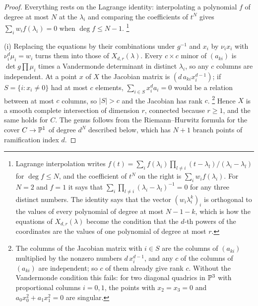 \begin{proof}
Everything rests on the Lagrange identity: interpolating a polynomial $f$
of degree at most $N$ at the $\lambda_{i}$ and comparing the coefficients of
$t^{N}$ gives $\sum_{i}w_{i}f(\lambda_{i})=0$ when $\deg f\le N-1$.%
\footnote{Lagrange interpolation writes
$f(t)=\sum_{i}f(\lambda_{i})\prod_{l\ne i}(t-\lambda_{l})/(\lambda_{i}-\lambda_{l})$
for $\deg f\le N$, and the coefficient of $t^{N}$ on the right is
$\sum_{i}w_{i}f(\lambda_{i})$. For $N=2$ and $f=1$ it says that
$\sum_{i}\prod_{l\ne i}(\lambda_{i}-\lambda_{l})^{-1}=0$ for any three
distinct numbers. The
identity says that the vector $(w_{i}\lambda_{i}^{k})_{i}$ is orthogonal to the
values of every polynomial of degree at most $N-1-k$, which is how the
equations of $X_{d,r}(\lambda)$ become the condition that the $d$-th powers of
the coordinates are the values of one polynomial of degree at most $r$.}

(i) Replacing the equations by their combinations under $g^{-1}$ and $x_{i}$
by $\nu_{i}x_{i}$ with $\nu_{i}^{d}\mu_{i}=w_{i}$ turns them into those of
$X_{d,r}(\lambda)$. Every $c\times c$ minor of $(a_{ki})$ is
$\det g\prod\mu_{i}$ times a Vandermonde determinant in distinct
$\lambda_{i}$, so any $c$ columns are independent. At a point $x$ of $X$ the
Jacobian matrix is $(d\,a_{ki}x_{i}^{d-1})$; if $S=\{i:x_{i}\ne0\}$ had at most
$c$ elements, $\sum_{i\in S}x_{i}^{d}a_{i}=0$ would be a relation between at
most $c$ columns, so $|S|>c$ and the Jacobian has rank $c$.%
\footnote{The columns of the Jacobian matrix with $i\in S$ are the columns of
$(a_{ki})$ multiplied by the nonzero numbers $d\,x_{i}^{d-1}$, and any $c$ of
the columns of $(a_{ki})$ are independent; so $c$ of them already give rank
$c$. Without the Vandermonde condition this fails: for two diagonal
quadrics in $\mathbb{P}^{3}$ with proportional columns $i=0,1$, the points with
$x_{2}=x_{3}=0$ and $a_{0}x_{0}^{2}+a_{1}x_{1}^{2}=0$ are singular.} Hence $X$ is a
smooth complete intersection of dimension $r$, connected because $r\ge1$, and
the same holds for $C$. The genus follows from the Riemann--Hurwitz formula
for the cover $C\to\mathbb{P}^{1}$ of degree $d^{N}$ described below, which has
$N+1$ branch points of ramification index $d$.


\end{proof}
